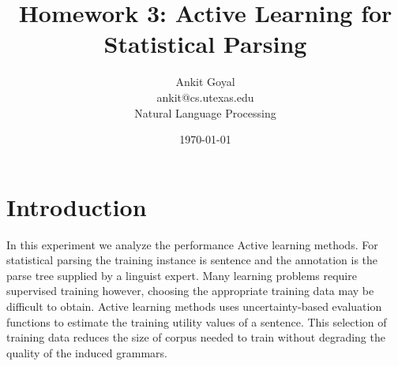 \documentclass[10pt] {article}
\author{Ankit Goyal \\ankit@cs.utexas.edu \\ Natural Language Processing}
\title{Homework 3: Active Learning for Statistical Parsing}
\date{\today}
\begin{document}
\maketitle


\section{Introduction}
In this experiment we analyze the performance Active learning methods. For statistical parsing the training instance is sentence and the annotation is the parse tree supplied by a linguist expert. Many learning problems require supervised training however, choosing the appropriate training data may be difficult to obtain. Active learning methods uses uncertainty-based  evaluation functions to estimate the training utility values of a sentence. This selection of training data reduces the size of corpus needed to train without degrading the quality of the induced grammars. \\
\end{document}
